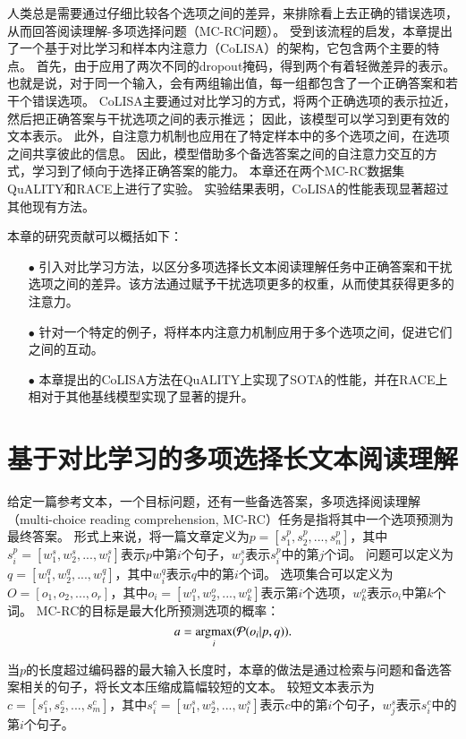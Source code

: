 人类总是需要通过仔细比较各个选项之间的差异，来排除看上去正确的错误选项，从而回答阅读理解-多项选择问题（MC-RC问题）\cite{daniel2017thinking}。
受到该流程的启发，本章提出了一个基于对比学习和样本内注意力（CoLISA）的架构，它包含两个主要的特点。
首先，由于应用了两次不同的dropout掩码，得到两个有着轻微差异的表示。
也就是说，对于同一个输入，会有两组输出值，每一组都包含了一个正确答案和若干个错误选项。
CoLISA主要通过对比学习的方式，将两个正确选项的表示拉近，然后把正确答案与干扰选项之间的表示推远；
因此，该模型可以学习到更有效的文本表示。
此外，自注意力机制\cite{vaswani2017attention}也应用在了特定样本中的多个选项之间，在选项之间共享彼此的信息。
因此，模型借助多个备选答案之间的自注意力交互的方式，学习到了倾向于选择正确答案的能力。
本章还在两个MC-RC数据集QuALITY\cite{pang2021quality}和RACE\cite{lai2017race}上进行了实验。
实验结果表明，CoLISA的性能表现显著超过其他现有方法。

本章的研究贡献可以概括如下：
\begin{itemize}
    \item[$\bullet$] 引入对比学习方法，以区分多项选择长文本阅读理解任务中正确答案和干扰选项之间的差异。该方法通过赋予干扰选项更多的权重，从而使其获得更多的注意力。
    \item[$\bullet$] 针对一个特定的例子，将样本内注意力机制应用于多个选项之间，促进它们之间的互动。
    \item[$\bullet$] 本章提出的CoLISA方法在QuALITY上实现了SOTA的性能，并在RACE上相对于其他基线模型实现了显著的提升。
\end{itemize}


\section{基于对比学习的多项选择长文本阅读理解}
给定一篇参考文本，一个目标问题，还有一些备选答案，多项选择阅读理解（multi-choice reading comprehension, MC-RC）任务是指将其中一个选项预测为最终答案。
形式上来说，将一篇文章定义为$p=[s^p_1, s^p_2, ..., s^p_n]$，其中$s^p_i=[w^s_1, w^s_2, ..., w^s_l]$表示$p$中第$i$个句子，$w^s_j$表示$s^p_i$中的第$j$个词。
问题可以定义为$q=[w^q_1, w^q_2, ..., w^q_t]$，其中$w^q_i$表示$q$中的第$i$个词。
选项集合可以定义为$O=[o_1, o_2, ..., o_r]$，其中$o_i=[w^o_1, w^o_2, ..., w^o_k]$表示第$i$个选项，$w^o_k$表示$o_i$中第$k$个词。
MC-RC的目标是最大化所预测选项的概率：
\begin{equation}
    a = \operatorname*{argmax}_i(\mathcal P(o_i|p,q)).
\end{equation}

当$p$的长度超过编码器的最大输入长度时，本章的做法是通过检索与问题和备选答案相关的句子，将长文本压缩成篇幅较短的文本。
较短文本表示为$c=[s^c_1, s^c_2, ..., s^c_m]$，其中$s^c_i=[w^s_1, w^s_2, ..., w^s_l]$表示$c$中的第$i$个句子，$w^s_j$表示$s^c_i$中的第$i$个句子。

